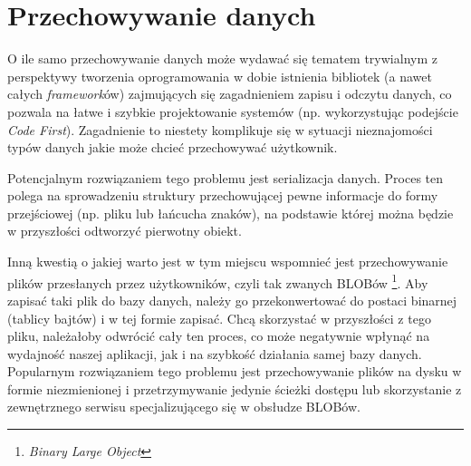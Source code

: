 \section{Przechowywanie danych}

\par O ile samo przechowywanie danych może wydawać się tematem trywialnym z perspektywy tworzenia oprogramowania w dobie istnienia bibliotek (a nawet całych \emph{framework}ów) zajmujących się zagadnieniem zapisu i odczytu danych, co pozwala na łatwe i szybkie projektowanie systemów (np. wykorzystując podejście \emph{Code First}). Zagadnienie to niestety komplikuje się w sytuacji nieznajomości typów danych jakie może chcieć przechowywać użytkownik.

\par Potencjalnym rozwiązaniem tego problemu jest serializacja danych. Proces ten polega na sprowadzeniu struktury przechowującej pewne informacje do formy przejściowej (np. pliku lub łańcucha znaków), na podstawie której można będzie w przyszłości odtworzyć pierwotny obiekt.

\par Inną kwestią o jakiej warto jest w tym miejscu wspomnieć jest przechowywanie plików przesłanych przez użytkowników, czyli tak zwanych BLOBów \footnote{\emph{Binary Large Object}}. Aby zapisać taki plik do bazy danych, należy go przekonwertować do postaci binarnej (tablicy bajtów) i w tej formie zapisać. Chcą skorzystać w przyszłości z tego pliku, należałoby odwrócić cały ten proces, co może negatywnie wpłynąć na wydajność naszej aplikacji, jak i na szybkość działania samej bazy danych. Popularnym rozwiązaniem tego problemu jest przechowywanie plików na dysku w formie niezmienionej i przetrzymywanie jedynie ścieżki dostępu lub skorzystanie z zewnętrznego serwisu specjalizującego się w obsłudze BLOBów.